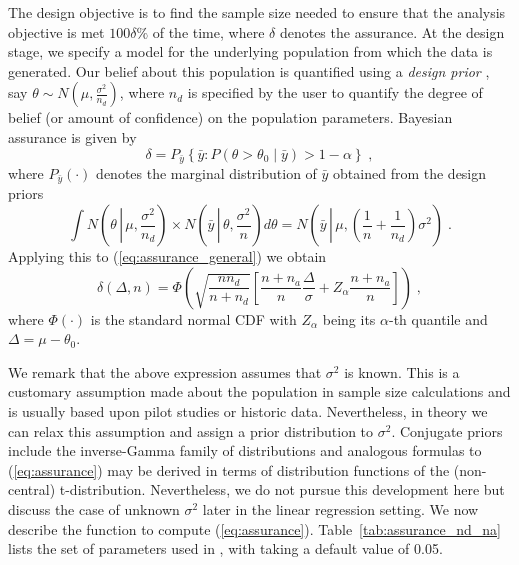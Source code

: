 The design objective is to find the sample size needed to ensure that the analysis objective is met $100\delta\%$ of the time, where $\delta$ denotes the assurance. At the design stage, we specify a model for the underlying population from which the data is generated. Our belief about this population is quantified using a \emph{design prior} \citep[we borrow this terminology from ][]{ohagan}, say $\theta \sim N\left(\mu, \frac{\sigma^2}{n_d}\right)$, where $n_d$ is specified by the user to quantify the degree of belief (or amount of confidence) on the population parameters. %
Bayesian assurance is given by
\begin{equation}\label{eq:assurance_general}
\delta = P_{\bar{y}}\left\{\bar{y}: P(\theta > \theta_0 \mid \bar{y}) > 1 - \alpha\right\}\;,
\end{equation}
where $P_{\bar{y}}(\cdot)$ denotes the marginal distribution of $\bar{y}$ obtained from the design priors 
\[
\int{N\left(\theta {\,\left|\,\mu, \frac{\sigma^2}{n_d}\right.}\right) \times N\left(\bar{y} {\,\left |\, \theta, \frac{\sigma^2}{n} \right.}\right) d\theta} 
= N\left(\bar{y} {\,\left |\,\mu, \left(\frac{1}{n} + \frac{1}{n_d}\right) \sigma^2 \right.}\right)\;.
\]
Applying this to (\ref{eq:assurance_general}) we obtain
\begin{equation} \label{eq:assurance}
\delta(\Delta, n) = \Phi\left(\sqrt{\frac{nn_d}{n+n_d}}
\left[\frac{n+n_a}{n}\frac{\Delta}{\sigma} + Z_{\alpha}\frac{n+n_a}{n}\right]\right)\;,
\end{equation}
where $\Phi(\cdot)$ is the standard normal CDF with $Z_{\alpha}$ being its $\alpha$-th quantile and $\Delta = \mu - \theta_0$. 

We remark that the above expression assumes that $\sigma^2$ is known. This is a customary assumption made about the population in sample size calculations and is usually based upon pilot studies or historic data. Nevertheless, in theory we can relax this assumption and assign a prior distribution to $\sigma^2$. Conjugate priors include the inverse-Gamma family of distributions and analogous formulas to (\ref{eq:assurance}) may be derived in terms of distribution functions of the (non-central) t-distribution. Nevertheless, we do not pursue this development here but discuss the case of unknown $\sigma^2$ later in the linear regression setting. We now describe the function to compute (\ref{eq:assurance}).
Table~\ref{tab:assurance_nd_na} lists the set of parameters used in , with  taking a default value of 0.05. 

